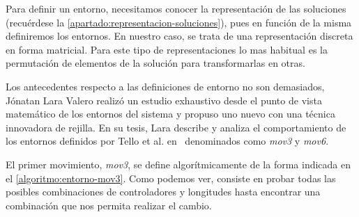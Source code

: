 Para definir un entorno, necesitamos conocer la representación de las soluciones (recuérdese la \autoref{apartado:representacion-soluciones}), pues en función de la misma definiremos los entornos. En nuestro caso, se trata de una representación discreta en forma matricial. Para este tipo de representaciones lo mas habitual es la permutación de elementos de la solución para transformarlas en otras.

Los antecedentes respecto a las definiciones de entorno no son demasiados, Jónatan Lara Valero realizó un estudio exhaustivo desde el punto de vista matemático de los entornos del sistema \legacy{} y propuso uno nuevo con una técnica innovadora de rejilla. En su tesis, Lara describe y analiza el comportamiento de los entornos definidos por Tello et al. en~\cite{articulo1} denominados como \textit{mov3} y \textit{mov6}. 

El primer movimiento, \textit{mov3}, se define algorítmicamente de la forma indicada en el \autoref{algoritmo:entorno-mov3}. Como podemos ver, consiste en probar todas las posibles combinaciones de controladores y longitudes hasta encontrar una combinación que nos permita realizar el cambio.

